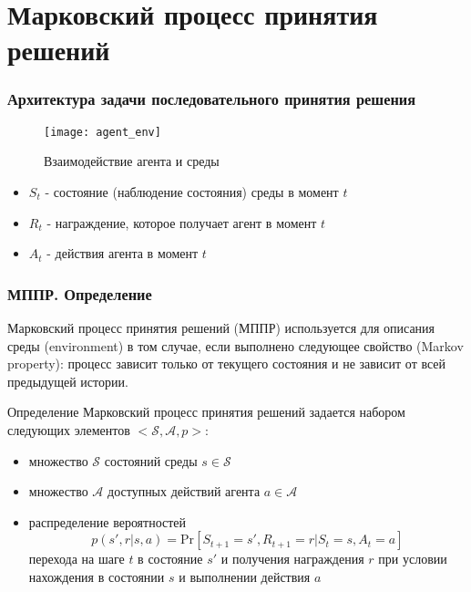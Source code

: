 \documentclass[notheorems]{beamer} %
\begin{document}
\section{Марковский процесс принятия решений}
\begin{frame}
\frametitle{ Архитектура задачи последовательного принятия решения}

\begin{figure}
	\centering
	\texttt{[image: agent\_env]}
	\caption{Взаимодействие агента и среды}
	\label{fig:question}
\end{figure}
\begin{itemize}
 \item $S_t$ - состояние (наблюдение состояния) среды в момент $t$
 \item $R_t$ - награждение, которое получает агент в момент  $t$
 \item $A_t$ - действия агента в момент $t$
\end{itemize}



\end{frame}
\begin{frame}
\frametitle{МППР. Определение}
Марковский процесс принятия решений (МППР) используется для описания среды (environment)  в том случае, если выполнено следующее свойство (Markov property): процесс зависит только от текущего состояния и не зависит от всей предыдущей истории.

\begin{block}{ Определение}
		Марковский процесс принятия решений задается набором следующих элементов $<\mathcal{S}, \mathcal{A}, p>$:
	\begin{itemize}
		\item множество  $\mathcal{S}$  состояний среды $s \in \mathcal{S}$
		\item множество $\mathcal{A}$ доступных действий агента $a \in \mathcal{A}$
		\item распределение вероятностей
		$$p(s',r|s,a)=\text{Pr}[S_{t+1}=s', R_{t+1}=r|S_t=s, A_t=a ]$$ перехода на шаге $t$  в состояние $s'$ и получения награждения  $r$ при условии нахождения в состоянии $s$ и выполнении действия $a$ 
	\end{itemize}
\end{block}
\end{frame}
\end{document}
